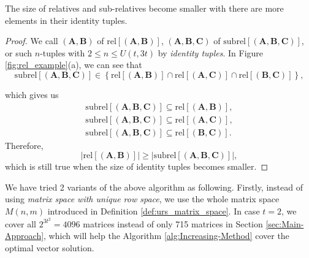 \begin{thm}
The size of relatives and sub-relatives become smaller with there
are more elements in their identity tuples. \label{theo:size_rel}
\end{thm}
\begin{proof}
We call $\left(\boldsymbol{A},\boldsymbol{B}\right)$ of $\mathrm{rel}\left[\left(\boldsymbol{A},\boldsymbol{B}\right)\right]$,
$\left(\boldsymbol{A},\boldsymbol{B},\boldsymbol{C}\right)$ of $\mathrm{subrel}\left[\left(\boldsymbol{A},\boldsymbol{B},\boldsymbol{C}\right)\right]$,
or such $n$-tuples with $2\leq n\leq U\left(t,3t\right)$ by \textit{identity
tuples}. In Figure \ref{fig:rel_example}(a), we can see that 
\[
\mathrm{subrel}\left[\left(\boldsymbol{A},\boldsymbol{B},\boldsymbol{C}\right)\right]\in\left\{ \mathrm{rel}\left[\left(\boldsymbol{A},\boldsymbol{B}\right)\right]\cap\mathrm{rel}\left[\left(\boldsymbol{A},\boldsymbol{C}\right)\right]\cap\mathrm{rel}\left[\left(\boldsymbol{B},\boldsymbol{C}\right)\right]\right\} ,
\]

which gives us
\[
\begin{array}{c}
\mathrm{subrel}\left[\left(\boldsymbol{A},\boldsymbol{B},\boldsymbol{C}\right)\right]\subseteq\mathrm{rel}\left[\left(\boldsymbol{A},\boldsymbol{B}\right)\right],\\
\mathrm{subrel}\left[\left(\boldsymbol{A},\boldsymbol{B},\boldsymbol{C}\right)\right]\subseteq\mathrm{rel}\left[\left(\boldsymbol{A},\boldsymbol{C}\right)\right],\\
\mathrm{subrel}\left[\left(\boldsymbol{A},\boldsymbol{B},\boldsymbol{C}\right)\right]\subseteq\mathrm{rel}\left[\left(\boldsymbol{B},\boldsymbol{C}\right)\right].
\end{array}
\]
Therefore,
\[
\left|\mathrm{rel}\left[\left(\boldsymbol{A},\boldsymbol{B}\right)\right]\right|\geq\left|\mathrm{subrel}\left[\left(\boldsymbol{A},\boldsymbol{B},\boldsymbol{C}\right)\right]\right|,
\]
which is still true when the size of identity tuples becomes smaller.
\end{proof}
We have tried 2 variants of the above algorithm as following. Firstly,
instead of using \textit{matrix space with unique row space}, we use
the whole matrix space $M\left(n,m\right)$ introduced in Definition
\ref{def:urs_matrix_space}. In case $t=2$, we cover all $2^{3t^{2}}=4096$
matrices instead of only 715 matrices in Section \ref{sec:Main-Approach},
which will help the Algorithm \ref{alg:Increasing-Method} cover the
optimal vector solution.
